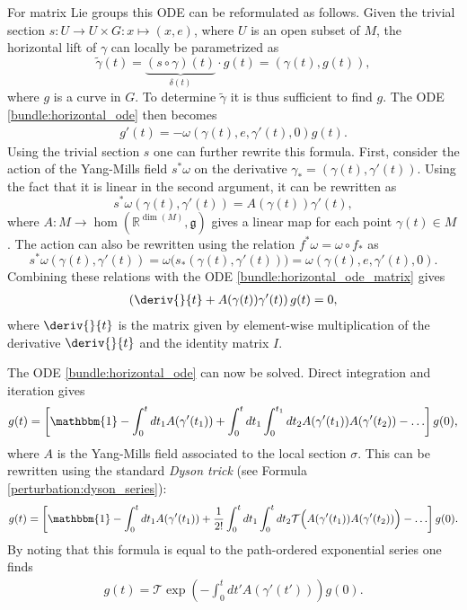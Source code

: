     \begin{example}
         For matrix Lie groups this ODE can be reformulated as follows. Given the trivial section $s:U\rightarrow U\times G:x\mapsto(x,e)$, where $U$ is an open subset of $M$, the horizontal lift of $\gamma$ can locally be parametrized as \[\widetilde{\gamma}(t) = \underbrace{(s\circ\gamma)(t)}_{\delta(t)}\cdot g(t) = (\gamma(t),g(t)),\] where $g$ is a curve in $G$. To determine $\widetilde{\gamma}$ it is thus sufficient to find $g$. The ODE \eqref{bundle:horizontal_ode} then becomes
        \begin{gather}
            \label{bundle:horizontal_ode_matrix}
            g'(t) = -\omega(\gamma(t),e,\gamma'(t),0)g(t).
        \end{gather}
        Using the trivial section $s$ one can further rewrite this formula. First, consider the action of the Yang-Mills field $s^*\omega$ on the derivative $\gamma_* = (\gamma(t),\gamma'(t))$. Using the fact that it is linear in the second argument, it can be rewritten as \[s^*\omega(\gamma(t),\gamma'(t)) = A(\gamma(t))\gamma'(t),\] where $A:M\rightarrow\hom(\mathbb{R}^{\dim(M)},\mathfrak{g})$ gives a linear map for each point $\gamma(t)\in M$. The action can also be rewritten using the relation $f^*\omega = \omega\circ f_\ast$ as \[s^*\omega(\gamma(t),\gamma'(t)) = \omega\Big(s_\ast(\gamma(t),\gamma'(t))\Big) = \omega(\gamma(t),e,\gamma'(t),0).\] Combining these relations with the ODE \eqref{bundle:horizontal_ode_matrix} gives
        \begin{gather}
            \label{bundle:horizontal_ode_derivative}
            \left(\deriv{}{t} + A(\gamma(t))\gamma'(t)\right)g(t) = 0,
        \end{gather}
        where $\deriv{}{t}$ is the matrix given by element-wise multiplication of the derivative $\deriv{}{t}$ and the identity matrix $I$.

        The ODE \eqref{bundle:horizontal_ode} can now be solved. Direct integration and iteration gives
        \begin{gather}
            g(t) = \left[\mathbbm{1} - \int_0^tdt_1A(\gamma'(t_1)) + \int_0^tdt_1\int_0^{t_1}dt_2A(\gamma'(t_1))A(\gamma'(t_2))-\ldots\right]g(0),
        \end{gather}
        where $A$ is the Yang-Mills field associated to the local section $\sigma$. This can be rewritten using the standard \textit{Dyson trick} (see Formula \ref{perturbation:dyson_series}):
        \begin{gather}
            g(t) = \left[\mathbbm{1} - \int_0^tdt_1A(\gamma'(t_1)) + \frac{1}{2!}\int_0^tdt_1\int_0^tdt_2\mathcal{T}\Big(A(\gamma'(t_1))A(\gamma'(t_2))\Big)-\ldots\right]g(0).
        \end{gather}
        By noting that this formula is equal to the path-ordered exponential series one finds
        \begin{gather}
            \label{bundle:g0_to_gt}
            g(t) = \mathcal{T}\exp\left(-\int_0^tdt'A(\gamma'(t'))\right)g(0).
        \end{gather}
    \end{example}

